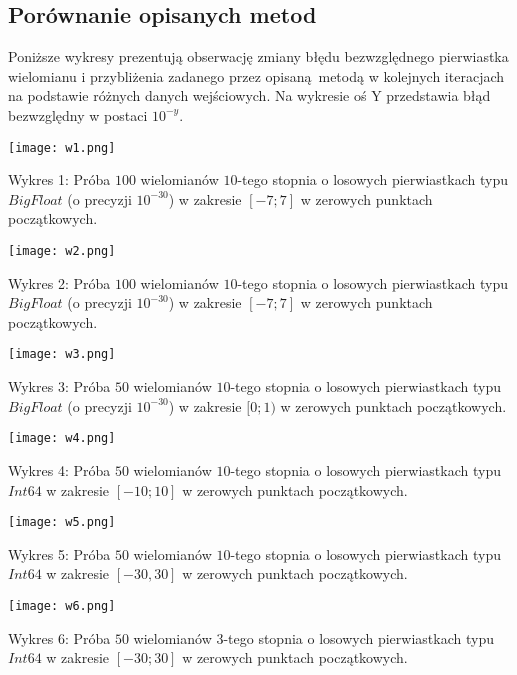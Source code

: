 \documentclass{article}
\begin{document}
\subsection{Porównanie opisanych metod}

Poniższe wykresy prezentują obserwację zmiany błędu bezwzględnego pierwiastka wielomianu i przybliżenia zadanego przez opisaną metodą w kolejnych iteracjach na podstawie różnych danych wejściowych. Na wykresie oś Y przedstawia błąd bezwzględny w postaci $10^{-y}$.

\texttt{[image: w1.png]}

Wykres 1:
Próba $100$ wielomianów $10$-tego stopnia o losowych pierwiastkach typu $BigFloat$ (o precyzji $10^{-30}$) w zakresie $[-7;7]$ w zerowych punktach początkowych.

\texttt{[image: w2.png]}

Wykres 2:
Próba $100$ wielomianów $10$-tego stopnia o losowych pierwiastkach typu $BigFloat$ (o precyzji $10^{-30}$) w zakresie $[-7;7]$ w zerowych punktach początkowych.


\texttt{[image: w3.png]}

Wykres 3:
Próba $50$ wielomianów $10$-tego stopnia o losowych pierwiastkach typu  $BigFloat$ (o precyzji $10^{-30}$) w zakresie $[0;1)$ w zerowych punktach początkowych.

\texttt{[image: w4.png]}

Wykres 4:
Próba $50$ wielomianów $10$-tego stopnia o losowych pierwiastkach typu $Int64$ w zakresie $[-10;10]$ w zerowych punktach początkowych.

\texttt{[image: w5.png]}

Wykres 5:
Próba $50$ wielomianów $10$-tego stopnia o losowych pierwiastkach typu $Int64$ w zakresie $[-30,30]$ w zerowych punktach początkowych.

\texttt{[image: w6.png]}

Wykres 6:
Próba $50$ wielomianów $3$-tego stopnia o losowych pierwiastkach typu $Int64$ w zakresie $[-30;30]$ w zerowych punktach początkowych.

\pagebreak
\end{document}
